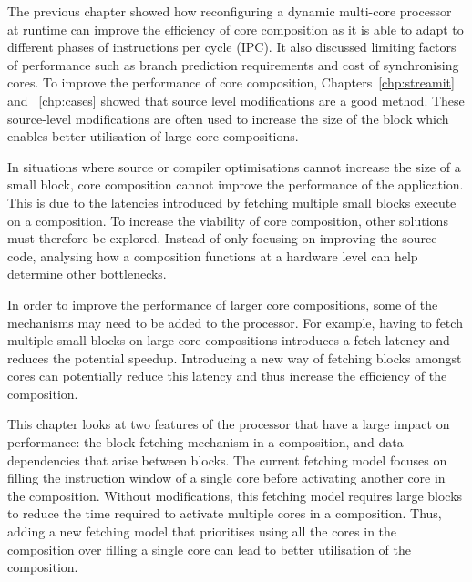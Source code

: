The previous chapter showed how reconfiguring a dynamic multi-core processor at runtime can improve the efficiency of core composition as it is able to adapt to different phases of instructions per cycle (IPC).
It also discussed limiting factors of performance such as branch prediction requirements and cost of synchronising cores.
To improve the performance of core composition, Chapters~\ref{chp:streamit} and ~\ref{chp:cases} showed that source level modifications are a good method.
These source-level modifications are often used to increase the size of the block which enables better utilisation of large core compositions.

In situations where source or compiler optimisations cannot increase the size of a small block, core composition cannot improve the performance of the application.
This is due to the latencies introduced by fetching multiple small blocks execute on a composition.
To increase the viability of core composition, other solutions must therefore be explored.
Instead of only focusing on improving the source code, analysing how a composition functions at a hardware level can help determine other bottlenecks.

In order to improve the performance of larger core compositions, some of the mechanisms may need to be added to the processor.%
For example, having to fetch multiple small blocks on large core compositions introduces a fetch latency and reduces the potential speedup.
Introducing a new way of fetching blocks amongst cores can potentially reduce this latency and thus increase the efficiency of the composition.

This chapter looks at two features of the processor that have a large impact on performance: the block fetching mechanism in a composition, and data dependencies that arise between blocks.
The current fetching model focuses on filling the instruction window of a single core before activating another core in the composition.
Without modifications, this fetching model requires large blocks to reduce the time required to activate multiple cores in a composition.
Thus, adding a new fetching model that prioritises using all the cores in the composition over filling a single core can lead to better utilisation of the composition.

